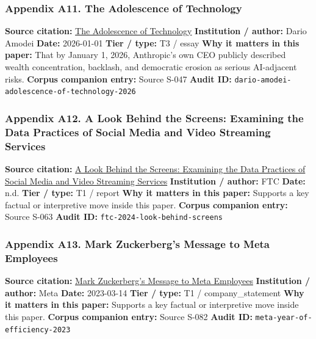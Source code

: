 \documentclass[
  american,
  11pt,
  letterpaper,
]{article}
\begin{document}
\subsubsection{Appendix A11. The Adolescence of
Technology}\label{appendix-a11-the-adolescence-of-technology}

\textbf{Source citation:}
\href{https://darioamodei.com/essay/the-adolescence-of-technology}{The
Adolescence of Technology} \textbf{Institution / author:} Dario Amodei
\textbf{Date:} 2026-01-01 \textbf{Tier / type:} T3 / essay \textbf{Why
it matters in this paper:} That by January 1, 2026, Anthropic's own CEO
publicly described wealth concentration, backlash, and democratic
erosion as serious AI-adjacent risks. \textbf{Corpus companion entry:}
Source S-047 \textbf{Audit ID:}
\texttt{dario-amodei-adolescence-of-technology-2026}

\subsubsection{Appendix A12. A Look Behind the Screens: Examining the
Data Practices of Social Media and Video Streaming
Services}\label{appendix-a12-a-look-behind-the-screens-examining-the-data-practices-of-social-media-and-video-streaming-services}

\textbf{Source citation:}
\href{https://www.ftc.gov/reports/look-behind-screens-examining-data-practices-social-media-video-streaming-services}{A
Look Behind the Screens: Examining the Data Practices of Social Media
and Video Streaming Services} \textbf{Institution / author:} FTC
\textbf{Date:} n.d. \textbf{Tier / type:} T1 / report \textbf{Why it
matters in this paper:} Supports a key factual or interpretive move
inside this paper. \textbf{Corpus companion entry:} Source S-063
\textbf{Audit ID:} \texttt{ftc-2024-look-behind-screens}

\subsubsection{Appendix A13. Mark Zuckerberg's Message to Meta
Employees}\label{appendix-a13-mark-zuckerberg-s-message-to-meta-employees}

\textbf{Source citation:}
\href{https://about.fb.com/news/2023/03/mark-zuckerberg-meta-year-of-efficiency/}{Mark
Zuckerberg's Message to Meta Employees} \textbf{Institution / author:}
Meta \textbf{Date:} 2023-03-14 \textbf{Tier / type:} T1 /
company\_statement \textbf{Why it matters in this paper:} Supports a key
factual or interpretive move inside this paper. \textbf{Corpus companion
entry:} Source S-082 \textbf{Audit ID:}
\texttt{meta-year-of-efficiency-2023}
\end{document}
